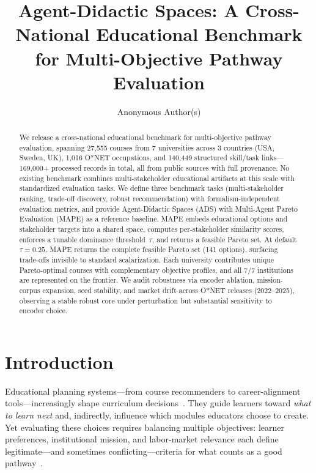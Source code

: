 \documentclass[sigconf,review]{acmart}
\title{Agent-Didactic Spaces: A Cross-National Educational Benchmark for Multi-Objective Pathway Evaluation}
\author{Anonymous Author(s)}
\affiliation{%
  \institution{Anonymous Institution}
  \city{Anonymous City}
  \country{Anonymous Country}
}
\newcommand{\HeadlineRecords}{169,000}       %
\newcommand{\NumCourses}{27,555}             %
\newcommand{\NumOccupations}{1,016}          %
\newcommand{\NumAttributeRecords}{140,449}   %
\newcommand{\NumUniversities}{7}
\newcommand{\NumCountries}{3}                %
\newcommand{\MainParetoSize}{141}
\newcommand{\NumUnisContributing}{7}         %
\newcommand{\ADS}{\textsc{ADS}\xspace}
\newcommand{\MAPE}{\textsc{MAPE}\xspace}
\begin{document}
\begin{abstract}
We release a cross-national educational benchmark for multi-objective pathway evaluation, spanning {\NumCourses} courses from {\NumUniversities} universities across {\NumCountries} countries (USA, Sweden, UK), {\NumOccupations} O*NET occupations, and {\NumAttributeRecords} structured skill/task links---{\HeadlineRecords}+ processed records in total, all from public sources with full provenance.
No existing benchmark combines multi-stakeholder educational artifacts at this scale with standardized evaluation tasks. We define three benchmark tasks (multi-stakeholder ranking, trade-off discovery, robust recommendation) with formalism-independent evaluation metrics, and provide Agent-Didactic Spaces (\ADS) with Multi-Agent Pareto Evaluation (\MAPE) as a reference baseline. \MAPE embeds educational options and stakeholder targets into a shared space, computes per-stakeholder similarity scores, enforces a tunable dominance threshold~$\tau$, and returns a feasible Pareto set.
At default $\tau{=}0.25$, \MAPE returns the complete feasible Pareto set ({\MainParetoSize} options), surfacing trade-offs invisible to standard scalarization. Each university contributes unique Pareto-optimal courses with complementary objective profiles, and all {\NumUnisContributing}/{\NumUniversities} institutions are represented on the frontier. We audit robustness via encoder ablation, mission-corpus expansion, seed stability, and market drift across O*NET releases (2022--2025), observing a stable robust core under perturbation but substantial sensitivity to encoder choice.
\end{abstract}

\maketitle


\section{Introduction}

Educational planning systems---from course recommenders to career-alignment tools---increasingly shape curriculum decisions~\cite{dasilva2022slrERS,aucancela2023ersslr}. They guide learners toward \emph{what to learn next} and, indirectly, influence which modules educators choose to create. Yet evaluating these choices requires balancing multiple objectives: learner preferences, institutional mission, and labor-market relevance each define legitimate---and sometimes conflicting---criteria for what counts as a good pathway~\cite{abdollahpouri2020multistakeholder}.
\end{document}
